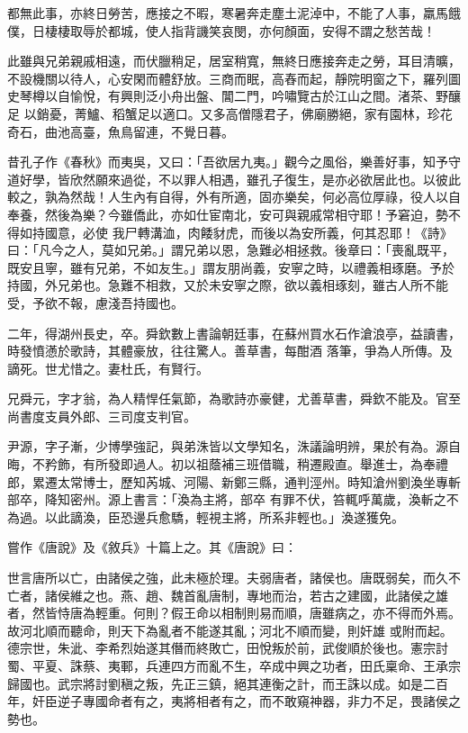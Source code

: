 \begin{pinyinscope}
 都無此事，亦終日勞苦，應接之不暇，寒暑奔走塵土泥淖中，不能了人事，羸馬餓僕，日棲棲取辱於都城，使人指背譏笑哀閔，亦何顏面，安得不謂之愁苦哉！



 此雖與兄弟親戚相遠，而伏臘稍足，居室稍寬，無終日應接奔走之勞，耳目清曠，不設機關以待人，心安閑而體舒放。三商而眠，高舂而起，靜院明窗之下，羅列圖史琴樽以自愉悅，有興則泛小舟出盤、閶二門，吟嘯覽古於江山之間。渚茶、野釀足
 以銷憂，菁鱸、稻蟹足以適口。又多高僧隱君子，佛廟勝絕，家有園林，珍花奇石，曲池高臺，魚鳥留連，不覺日暮。



 昔孔子作《春秋》而夷吳，又曰：「吾欲居九夷。」觀今之風俗，樂善好事，知予守道好學，皆欣然願來過從，不以罪人相遇，雖孔子復生，是亦必欲居此也。以彼此較之，孰為然哉！人生內有自得，外有所適，固亦樂矣，何必高位厚祿，役人以自奉養，然後為樂？今雖僑此，亦如仕宦南北，安可與親戚常相守耶！予窘迫，勢不得如持國意，必使
 我尸轉溝洫，肉餧豺虎，而後以為安所義，何其忍耶！《詩》曰：「凡今之人，莫如兄弟。」謂兄弟以恩，急難必相拯救。後章曰：「喪亂既平，既安且寧，雖有兄弟，不如友生。」謂友朋尚義，安寧之時，以禮義相琢磨。予於持國，外兄弟也。急難不相救，又於未安寧之際，欲以義相琢刻，雖古人所不能受，予欲不報，慮淺吾持國也。



 二年，得湖州長史，卒。舜欽數上書論朝廷事，在蘇州買水石作滄浪亭，益讀書，時發憤懣於歌詩，其體豪放，往往驚人。善草書，每酣酒
 落筆，爭為人所傳。及謫死。世尤惜之。妻杜氏，有賢行。



 兄舜元，字才翁，為人精悍任氣節，為歌詩亦豪健，尤善草書，舜欽不能及。官至尚書度支員外郎、三司度支判官。



 尹源，字子漸，少博學強記，與弟洙皆以文學知名，洙議論明辨，果於有為。源自晦，不矜飾，有所發即過人。初以祖蔭補三班借職，稍遷殿直。舉進士，為奉禮郎，累遷太常博士，歷知芮城、河陽、新鄭三縣，通判涇州。時知滄州劉渙坐專斬部卒，降知密州。源上書言：「渙為主將，部卒
 有罪不伏，笞輒呼萬歲，渙斬之不為過。以此謫渙，臣恐邊兵愈驕，輕視主將，所系非輕也。」渙遂獲免。



 嘗作《唐說》及《敘兵》十篇上之。其《唐說》曰：



 世言唐所以亡，由諸侯之強，此未極於理。夫弱唐者，諸侯也。唐既弱矣，而久不亡者，諸侯維之也。燕、趙、魏首亂唐制，專地而治，若古之建國，此諸侯之雄者，然皆恃唐為輕重。何則？假王命以相制則易而順，唐雖病之，亦不得而外焉。故河北順而聽命，則天下為亂者不能遂其亂；河北不順而變，則奸雄
 或附而起。德宗世，朱泚、李希烈始遂其僭而終敗亡，田悅叛於前，武俊順於後也。憲宗討蜀、平夏、誅蔡、夷鄆，兵連四方而亂不生，卒成中興之功者，田氏稟命、王承宗歸國也。武宗將討劉稹之叛，先正三鎮，絕其連衡之計，而王誅以成。如是二百年，奸臣逆子專國命者有之，夷將相者有之，而不敢窺神器，非力不足，畏諸侯之勢也。




\end{pinyinscope}
